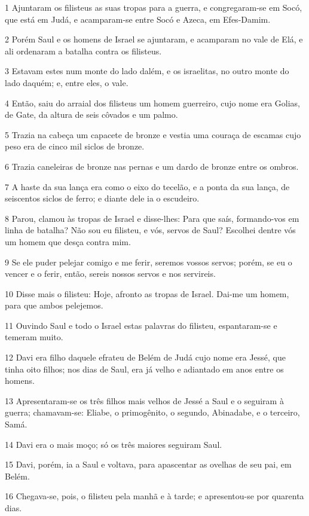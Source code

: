 \par 1 Ajuntaram os filisteus as suas tropas para a guerra, e congregaram-se em Socó, que está em Judá, e acamparam-se entre Socó e Azeca, em Efes-Damim.
\par 2 Porém Saul e os homens de Israel se ajuntaram, e acamparam no vale de Elá, e ali ordenaram a batalha contra os filisteus.
\par 3 Estavam estes num monte do lado dalém, e os israelitas, no outro monte do lado daquém; e, entre eles, o vale.
\par 4 Então, saiu do arraial dos filisteus um homem guerreiro, cujo nome era Golias, de Gate, da altura de seis côvados e um palmo.
\par 5 Trazia na cabeça um capacete de bronze e vestia uma couraça de escamas cujo peso era de cinco mil siclos de bronze.
\par 6 Trazia caneleiras de bronze nas pernas e um dardo de bronze entre os ombros.
\par 7 A haste da sua lança era como o eixo do tecelão, e a ponta da sua lança, de seiscentos siclos de ferro; e diante dele ia o escudeiro.
\par 8 Parou, clamou às tropas de Israel e disse-lhes: Para que saís, formando-vos em linha de batalha? Não sou eu filisteu, e vós, servos de Saul? Escolhei dentre vós um homem que desça contra mim.
\par 9 Se ele puder pelejar comigo e me ferir, seremos vossos servos; porém, se eu o vencer e o ferir, então, sereis nossos servos e nos servireis.
\par 10 Disse mais o filisteu: Hoje, afronto as tropas de Israel. Dai-me um homem, para que ambos pelejemos.
\par 11 Ouvindo Saul e todo o Israel estas palavras do filisteu, espantaram-se e temeram muito.
\par 12 Davi era filho daquele efrateu de Belém de Judá cujo nome era Jessé, que tinha oito filhos; nos dias de Saul, era já velho e adiantado em anos entre os homens.
\par 13 Apresentaram-se os três filhos mais velhos de Jessé a Saul e o seguiram à guerra; chamavam-se: Eliabe, o primogênito, o segundo, Abinadabe, e o terceiro, Samá.
\par 14 Davi era o mais moço; só os três maiores seguiram Saul.
\par 15 Davi, porém, ia a Saul e voltava, para apascentar as ovelhas de seu pai, em Belém.
\par 16 Chegava-se, pois, o filisteu pela manhã e à tarde; e apresentou-se por quarenta dias.
